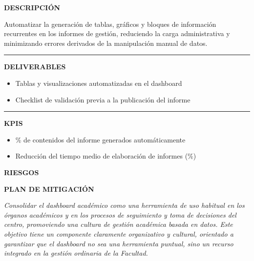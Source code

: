 \documentclass[11pt,a4paper]{scrreprt}
\newcommand{\fieldlabel}[1]{%
  {\footnotesize\sffamily\bfseries\color{mutedcolor}\MakeUppercase{#1}}\par\nopagebreak[4]
}
\newcommand{\fieldsep}{\vspace{3pt}\noindent\textcolor{bordercolor}{\rule{\linewidth}{0.4pt}}\vspace{3pt}\par}
\begin{document}
\begin{tcolorbox}[pabox={dashcolor}{PA4.2 \enspace\textbullet\enspace Automatización de contenidos clave de los informes de gestión}]

\fieldlabel{Descripci\'on}
{\small Automatizar la generación de tablas, gráficos y bloques de información recurrentes en los informes de gestión, reduciendo la carga administrativa y minimizando errores derivados de la manipulación manual de datos.}\par
\fieldsep
\fieldlabel{Deliverables}
{\small \begin{itemize}[noitemsep,topsep=2pt]
\item Tablas y visualizaciones automatizadas en el dashboard
\item Checklist de validación previa a la publicación del informe
\end{itemize}}\par
\fieldsep
\fieldlabel{KPIs}
{\small \begin{itemize}[noitemsep,topsep=2pt]
\item \% de contenidos del informe generados automáticamente
\item Reducción del tiempo medio de elaboración de informes (\%)
\end{itemize}}\par
\end{tcolorbox}
\begin{tcolorbox}[riskbox]
{\footnotesize\sffamily\bfseries\color{red!50!black} RIESGOS}\par{}
\end{tcolorbox}
\begin{tcolorbox}[mitbox]
{\footnotesize\sffamily\bfseries\color{green!40!black} PLAN DE MITIGACI\'ON}\par{}
\end{tcolorbox}
\vspace{8pt}

\newpage
{}
{\small\color{mutedcolor}\itshape Consolidar el dashboard académico como una herramienta de uso habitual en los órganos académicos y en los procesos de seguimiento y toma de decisiones del centro, promoviendo una cultura de gestión académica basada en datos. Este objetivo tiene un componente claramente organizativo y cultural, orientado a garantizar que el dashboard no sea una herramienta puntual, sino un recurso integrado en la gestión ordinaria de la Facultad.}\par\vspace{6pt}
\end{document}
